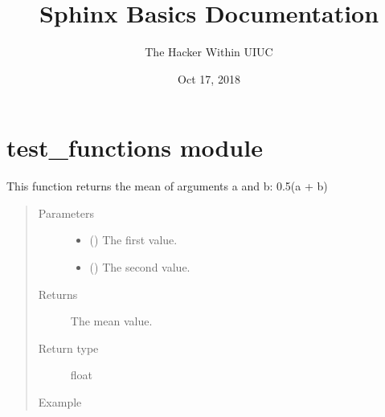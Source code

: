 \documentclass[letterpaper,10pt,english]{sphinxmanual}
\title{Sphinx Basics Documentation}
\date{Oct 17, 2018}
\author{The Hacker Within UIUC}
\begin{document}
\maketitle
\sphinxtableofcontents
{}\label{\detokenize{index::doc}}



\chapter{test\_functions module}
\label{\detokenize{test_functions:test-functions-module}}\label{\detokenize{test_functions:module-test_functions}}\label{\detokenize{test_functions::doc}}\label{\detokenize{test_functions:welcome-to-sphinx-basics-s-documentation}}

\begin{fulllineitems}
\label{\detokenize{test_functions:test_functions.mean_val}}
This function returns the mean of arguments a and b: 0.5(a + b)
\begin{quote}\begin{description}
\item[{Parameters}] \leavevmode\begin{itemize}
\item {} 
 () \textendash{} The first value.

\item {} 
 () \textendash{} The second value.

\end{itemize}

\item[{Returns}] \leavevmode
The mean value.

\item[{Return type}] \leavevmode
float

\item[{Example}] \leavevmode
{}%
\begin{sphinxVerbatim}[commandchars=\\\{\}]
 
\end{sphinxVerbatim}

\end{description}\end{quote}

\end{fulllineitems}
\end{document}
